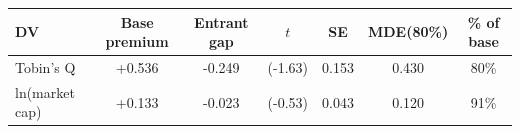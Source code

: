\begin{tabular}{lcccccc}
\toprule
DV & Base premium & Entrant gap & $t$ & SE & MDE(80\%) & \% of base \\
\midrule
Tobin's Q & +0.536 & -0.249 & (-1.63) & 0.153 & 0.430 & 80\% \\
ln(market cap) & +0.133 & -0.023 & (-0.53) & 0.043 & 0.120 & 91\% \\
\bottomrule
\end{tabular}
